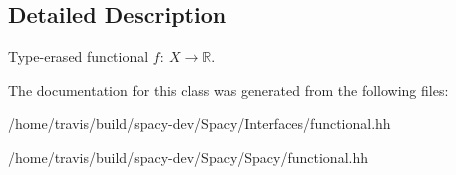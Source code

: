 \subsection{\-Detailed \-Description}
\-Type-\/erased functional $f:\ X \to \mathbb{R} $. 

\-The documentation for this class was generated from the following files\-:\begin{DoxyCompactItemize}
\item 
/home/travis/build/spacy-\/dev/\-Spacy/\-Interfaces/functional.\-hh\item 
/home/travis/build/spacy-\/dev/\-Spacy/\-Spacy/functional.\-hh\end{DoxyCompactItemize}

